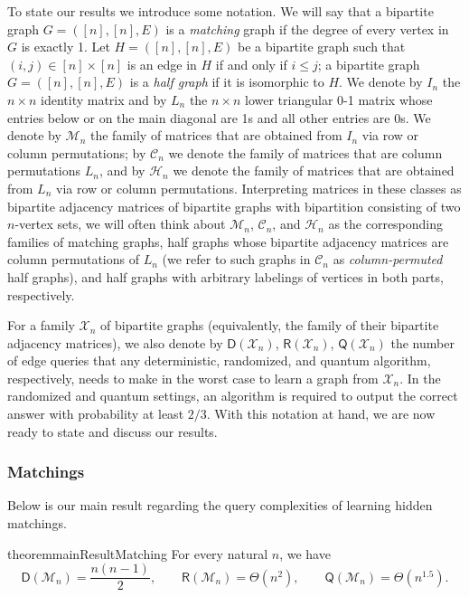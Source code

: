 \documentclass[11pt]{article}
\newcommand{\cC}{\mathcal{C}}
\newcommand{\cH}{\mathcal{H}}
\newcommand{\cM}{\mathcal{M}}
\newcommand{\cX}{\mathcal{X}}
\newcommand{\sD}{\mathsf{D}}
\newcommand{\sQ}{\mathsf{Q}}
\newcommand{\sR}{\mathsf{R}}
\begin{document}
To state our results we introduce some notation.
We will say that a bipartite graph $G = ([n],[n], E)$ is a \emph{matching} graph if the degree of every vertex in $G$ is exactly 1. Let $H=([n],[n], E)$ be a bipartite graph such that $(i,j) \in [n] \times [n]$ is an edge in $H$ if and only if $i \leq j$; a bipartite graph $G = ([n],[n], E)$ is a \emph{half graph} if it is isomorphic to $H$.
We denote by $I_n$ the $n \times n$ identity matrix and by $L_n$ the $n \times n$ lower triangular 0-1 matrix whose entries below or on the main diagonal are 1s and all other entries are 0s.
We denote by $\cM_n$ the family of matrices that are obtained from $I_n$ via row or column permutations; by $\cC_n$ we denote the family of matrices that are column permutations $L_n$, and by $\cH_n$ we denote the family of matrices that are obtained from $L_n$ via row or column permutations.
Interpreting matrices in these classes as bipartite adjacency matrices of bipartite graphs with bipartition consisting of two $n$-vertex sets, we will often think about $\cM_n$, $\cC_n$, and $\cH_n$ as the corresponding families of matching graphs, half graphs whose bipartite adjacency matrices are column permutations of $L_n$ (we refer to such graphs in $\cC_n$ as \emph{column-permuted} half graphs), and half graphs with arbitrary labelings of vertices in both parts, respectively.

For a family $\cX_n$ of bipartite graphs (equivalently, the family of their bipartite adjacency matrices), we also denote by $\sD(\cX_n)$, $\sR(\cX_n)$, $\sQ(\cX_n)$ the number of edge queries that any deterministic, randomized, and quantum algorithm, respectively, needs to make in the worst case to learn a graph from $\cX_n$. In the randomized and quantum settings, an algorithm is required to output the correct answer with probability at least $2/3$.
%
With this notation at hand, we are now ready to state and discuss our results.

\subsubsection{Matchings}
Below is our main result regarding the query complexities of learning hidden matchings.

\begin{restatable}{theorem}{mainResultMatching}
\label{thm-matching}
    For every natural $n$, we have
    $$
        \sD(\cM_n) = \frac{n(n - 1)}{2}, \qquad 
        \sR(\cM_n) = \Theta(n^2), \qquad
        \sQ(\cM_n) = \Theta(n^{1.5}).
    $$
\end{restatable}
\end{document}
